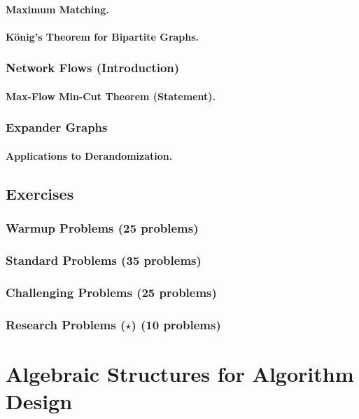 \paragraph{Maximum Matching.}
\paragraph{König's Theorem for Bipartite Graphs.}

\subsubsection{Network Flows (Introduction)}
\paragraph{Max-Flow Min-Cut Theorem (Statement).}

\subsubsection{Expander Graphs}
\paragraph{Applications to Derandomization.}

\subsection{Exercises}
\subsubsection{Warmup Problems (25 problems)}
\subsubsection{Standard Problems (35 problems)}
\subsubsection{Challenging Problems (25 problems)}
\subsubsection{Research Problems ($\star$) (10 problems)}

\section{Algebraic Structures for Algorithm Design}
\label{sec:algebra}

